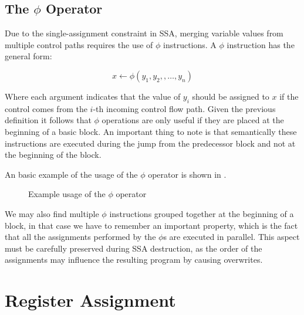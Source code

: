 \subsection{The $\phi$ Operator}
\label{subsec:phi}

Due to the single-assignment constraint in SSA, merging variable values from multiple control paths requires the use of $\phi$ instructions. A $\phi$ instruction has the general form:

\[
x \leftarrow \phi(y_1, y_2, , \dots, y_n)
\]

Where each argument indicates that the value of $y_i$ should be assigned to $x$ if the control comes from the $i$-th incoming control flow path. Given the previous definition it follows that $\phi$ operations are only useful if they are placed at the beginning of a basic block. An important thing to note is that semantically these instructions are executed during the jump from the predecessor block and not at the beginning of the block.

An basic example of the usage of the $\phi$ operator is shown in .

\begin{figure}[ht]
    \centering
    \caption{Example usage of the $\phi$ operator}
    \label{fig:phi-usage}
\end{figure}

We may also find multiple $\phi$ instructions grouped together at the beginning of a block, in that case we have to remember an important property, which is the fact that all the assignments performed by the $\phi$s are executed in parallel. This aspect must be carefully preserved during SSA destruction, as the order of the assignments may influence the resulting program by causing overwrites.

\section{Register Assignment}
\label{sec:ra}

